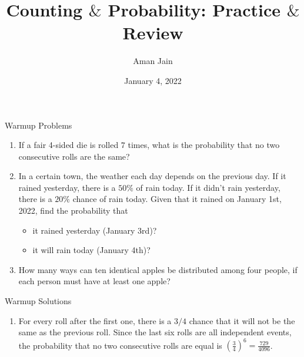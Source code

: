 \documentclass[9pt]{beamer}
\title[Short title]{Counting $\&$ Probability: Practice $\&$ Review } %
\author{Aman Jain} %
\institute[MATHCOUNTS Fermat Class] %
{
MATHCOUNTS Fermat Class \\ %
\medskip
\textit{} %
}
\date{January 4, 2022} %
\begin{document}
\begin{frame}
\titlepage %
\end{frame}




\begin{frame}[t]{Warmup Problems} 
    \begin{enumerate}
        \item If a fair 4-sided die is rolled $7$ times, what is the probability that no two consecutive rolls are the same?
        \item In a certain town, the weather each day depends on the previous day. If it rained yesterday, there is a $50\%$ of rain today. If it didn't rain yesterday, there is a $20\%$ chance of rain today. Given that it rained on January 1st, 2022, find the probability that
            \begin{itemize}
                \item it rained yesterday (January 3rd)?
                \item it will rain today (January 4th)?
            \end{itemize}
        \item How many ways can ten identical apples be distributed among four people, if each person must have at least one apple?
    \end{enumerate}
\end{frame}

\begin{frame}[t]{Warmup Solutions}
    \begin{enumerate}
        \item For every roll after the first one, there is a $3/4$ chance that it will not be the same as the previous roll. Since the last six rolls are all independent events, the probability that no two consecutive rolls are equal is $\left(\frac{3}{4}\right)^6=\frac{729}{4096}$.
        
        
    \end{enumerate}
    
\end{frame}
 
\end{document}
